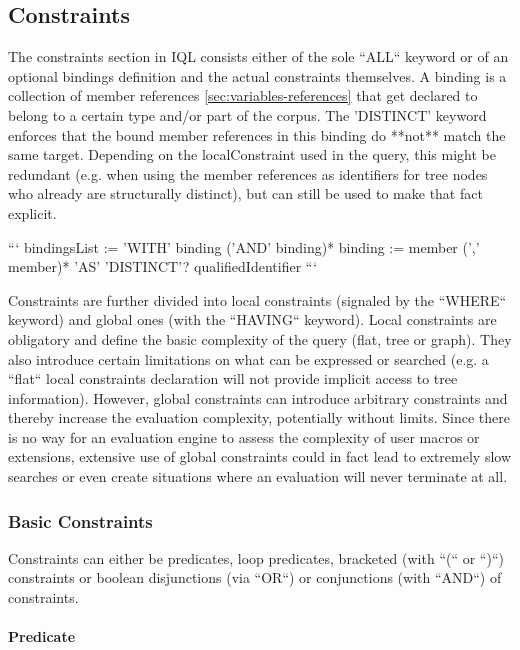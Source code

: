\documentclass[11pt]{article}
\begin{document}
\subsection{Constraints}
\label{sec:constraints}

The constraints section in IQL consists either of the sole ``ALL`` keyword or of an optional bindings definition and the actual constraints themselves. A binding is a collection of member references \cref{sec:variables-references} that get declared to belong to a certain type and/or part of the corpus. The 'DISTINCT' keyword enforces that the bound member references in this binding do **not** match the same target. Depending on the localConstraint used in the query, this might be redundant (e.g. when using the member references as identifiers for tree nodes who already are structurally distinct), but can still be used to make that fact explicit. 

```
bindingsList := 'WITH' binding ('AND' binding)* 
binding := member (',' member)* 'AS' 'DISTINCT'? qualifiedIdentifier
```

Constraints are further divided into local constraints (signaled by the ``WHERE`` keyword) and global ones (with the ``HAVING`` keyword). Local constraints are obligatory and define the basic complexity of the query (flat, tree or graph). They also introduce certain limitations on what can be expressed or searched (e.g. a ``flat`` local constraints declaration will not provide implicit access to tree information). However, global constraints can introduce arbitrary constraints and thereby increase the evaluation complexity, potentially without limits. Since there is no way for an evaluation engine to assess the complexity of user macros or extensions, extensive use of global constraints could in fact lead to extremely slow searches or even create situations where an evaluation will never terminate at all.

\subsubsection{Basic Constraints}
\label{sec:basic-constraints}

Constraints can either be predicates, loop predicates, bracketed (with ``(`` or ``)``) constraints or boolean disjunctions (via ``OR``) or conjunctions (with ``AND``) of constraints.

\paragraph{Predicate}
\label{sec:predicate}
\end{document}
